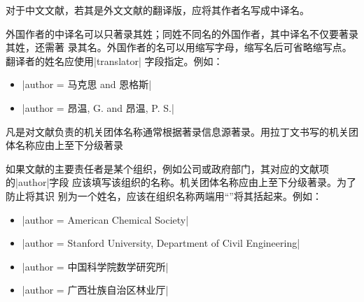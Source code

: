 对于中文文献，若其是外文文献的翻译版，应将其作者名写成中译名。

外国作者的中译名可以只著录其姓；同姓不同名的外国作者，其中译名不仅要著录其姓，还需著
录其名。外国作者的名可以用缩写字母，缩写名后可省略缩写点。翻译者的姓名应使用|translator|
字段指定。例如：
\begin{itemize}
\item |author = {马克思 and 恩格斯}|
\item |author = {昂温, G. and 昂温, P. S.}|
\end{itemize}

凡是对文献负责的机关团体名称通常根据著录信息源著录。用拉丁文书写的机关团体名称应由上至下分级著录 

如果文献的主要责任者是某个组织，例如公司或政府部门，其对应的文献项的|author|字段
应该填写该组织的名称。机关团体名称应由上至下分级著录。为了防止{\BibTeX}将其识
别为一个姓名，应该在组织名称两端用``{}''将其括起来。例如：
\begin{itemize}
\item |author = {{American Chemical Society}}|
\item |author = {{Stanford University, Department of Civil Engineering}}|
\item |author = {{中国科学院数学研究所}}|
\item |author = {{广西壮族自治区林业厅}}|
\end{itemize}

